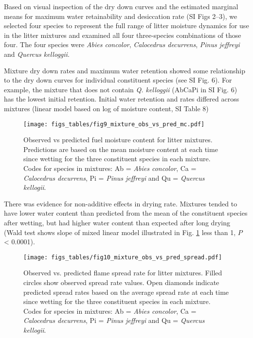 \documentclass[letterpaper,12pt]{article}
\begin{document}
Based on visual inspection of the dry down curves and the estimated marginal
means for maximum water retainability and desiccation rate (SI Figs 2--3), we
selected four species to represent the full range of litter moisture dynamics
for use in the litter mixtures and examined all four three-species combinations
of those four. The four species were \emph{Abies concolor}, \emph{Calocedrus
  decurrens}, \emph{Pinus jeffreyi} and \emph{Quercus kelloggii}.

Mixture dry down rates and maximum water retention showed some relationship to
the dry down curves for individual constituent species (see SI Fig. 6). For
example, the mixture that does not contain \emph{Q. kelloggii} (AbCaPi in SI
Fig. 6) has the lowest initial retention. Initial water retention and rates
differed across mixtures (linear model based on log of moisture content, SI Table 8)




\begin{figure}[h]
  \centering
\texttt{[image: figs\_tables/fig9\_mixture\_obs\_vs\_pred\_mc.pdf]}
\caption{Observed vs predicted fuel moisture content for litter mixtures.
  Predictions are based on the mean moisture content at each time since wetting
  for the three constituent species in each mixture. Codes for species in
  mixtures: Ab = \emph{Abies concolor}, Ca = \emph{Calocedrus decurrens}, Pi =
  \emph{Pinus jeffreyi} and Qu = \emph{Quercus kellogii}.}
  \label{fig:mixture_obs_pred_mc}
\end{figure}

There was evidence for non-additive effects in drying rate. Mixtures tended to
have lower water content than predicted from the mean of the constituent
species after wetting, but had higher water content than expected after long
drying (Wald test shows slope of mixed linear model illustrated in Fig.
\ref{fig:mixture_obs_pred_mc} less than 1, $P$ < 0.0001).


\begin{figure}[h]
  \centering
\texttt{[image: figs\_tables/fig10\_mixture\_obs\_vs\_pred\_spread.pdf]}
\caption{Observed vs. predicted flame spread rate for litter mixtures. Filled
  circles show observed spread rate values. Open diamonds indicate predicted
  spread rates based on the average spread rate at each time since wetting for
  the three constituent species in each mixture. Codes for species in mixtures:
  Ab = \emph{Abies concolor}, Ca = \emph{Calocedrus decurrens}, Pi =
  \emph{Pinus jeffreyi} and Qu = \emph{Quercus kellogii}.}
  \label{fig:mixture_obs_pred_spread}
\end{figure}
\end{document}
